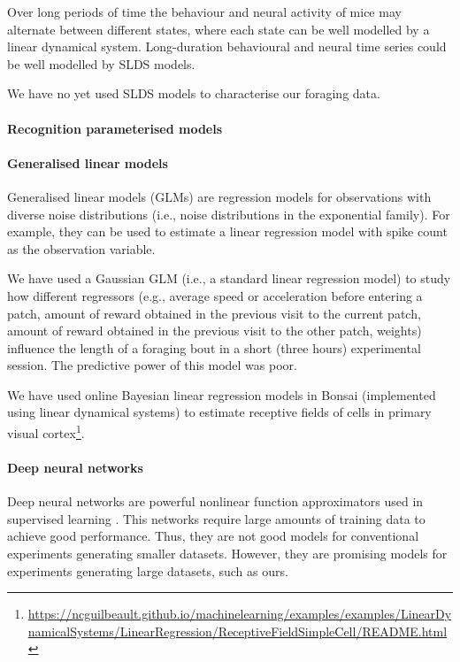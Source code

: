 Over long periods of time the behaviour and neural activity of mice may
alternate between different states, where each state can be well modelled by a
linear dynamical system. Long-duration behavioural and neural time series could
be well modelled by SLDS models.

We have no yet used SLDS models to characterise our foraging data.

\paragraph{Recognition parameterised models}

\paragraph{Generalised linear models}

Generalised linear models (GLMs) are regression models for observations with diverse
noise distributions (i.e., noise distributions in the exponential family). For
example, they can be used to estimate a linear regression model with spike
count as the observation variable.

We have used a Gaussian GLM (i.e., a standard linear regression model) to
study how different regressors (e.g., average speed or acceleration
before entering a patch, amount of reward obtained in the previous visit to the
current patch, amount of reward obtained in the previous visit to the other
patch, weights) influence the length of a foraging bout in a short (three
hours) experimental session. The predictive power of this model was poor.

We have used online Bayesian linear regression models in Bonsai (implemented
using linear dynamical systems) to estimate
receptive fields of cells in primary visual
cortex\footnote{\url{https://ncguilbeault.github.io/machinelearning/examples/examples/LinearDynamicalSystems/LinearRegression/ReceptiveFieldSimpleCell/README.html}}.

\paragraph{Deep neural networks}

Deep neural networks are powerful nonlinear function approximators used in
supervised learning \citep{goodfellowEtAl16}. This networks require large
amounts of training data to achieve good performance. Thus, they are not good
models for conventional experiments generating smaller datasets. However, they
are promising models for experiments generating large datasets, such as ours.

